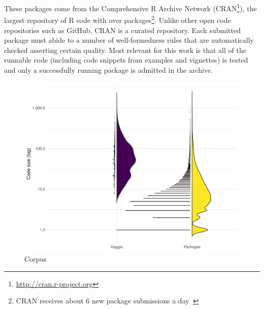 \documentclass[conference]{IEEEtran}
\begin{document}
These packages come from the Comprehensive R Archive Network
(CRAN\footnote{\url{http://cran.r-project.org}}), the largest repository of R
code with over \CorpusAllCranRnd packages\footnote{CRAN receives about 6 new
  package submissions a day~\cite{Ligges2017}}. Unlike other open code
repositories such as GitHub, CRAN is a curated repository. Each submitted
package must abide to a number of well-formedness rules that are automatically
checked asserting certain quality. Most relevant for this work is that all of
the runnable code (including code snippets from examples and vignettes) is
tested and only a successfully running package is admitted in the archive.

\begin{figure}[!tb]\centering\includegraphics[width=.9\linewidth]
  {programs-code.pdf}\caption{Corpus}\label{fig:corpus}
\end{figure}
\end{document}

